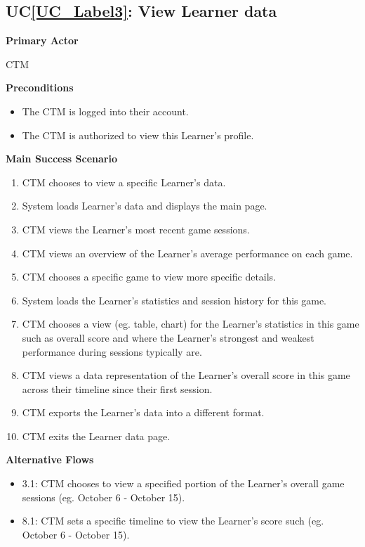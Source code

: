 \documentclass[12pt]{article}
\newcounter{ucnum} %
\newcommand{\ucref}[1]{UC\ref{#1}}
\begin{document}
 \label{UC_Label3}
\subsection{\ucref{UC_Label3}: View Learner data}

\textbf{Primary Actor}

CTM

\textbf{Preconditions}
\begin{itemize}
\item The CTM is logged into their account.
\item The CTM is authorized to view this Learner's profile.
\end{itemize}

\textbf{Main Success Scenario}
\begin{enumerate}
\item CTM chooses to view a specific Learner's data.
\item System loads Learner's data and displays the main page.
\item CTM views the Learner's most recent game sessions.
\item CTM views an overview of the Learner's average performance on each game.
\item CTM chooses a specific game to view more specific details.
\item System loads the Learner's statistics and session history for this game.
\item CTM chooses a view (eg. table, chart) for the Learner's statistics in this game such as overall score and where the Learner's strongest and weakest performance during sessions typically are.
\item CTM views a data representation of the Learner's overall score in this game across their timeline since their first session.
\item CTM exports the Learner's data into a different format.
\item CTM exits the Learner data page.
\end{enumerate}

\textbf{Alternative Flows}
\begin{itemize}
\item 3.1: CTM chooses to view a specified portion of the Learner's overall game sessions (eg. October 6 - October 15).

\item 8.1: CTM sets a specific timeline to view the Learner's score such (eg. October 6 - October 15).

\end{itemize}
\end{document}
